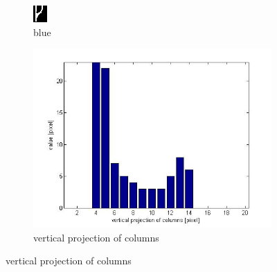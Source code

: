 \begin{figure}
\begin{subfigure}[t]{0.1\textwidth}
        \includegraphics[width=\textwidth]{5b.jpg}
        \caption{blue}
  \end{subfigure}
    \begin{subfigure}[c]{0.4\textwidth}
        \includegraphics[width=\textwidth]{5c.jpg}
        \caption{vertical projection of columns}
  \end{subfigure}
  

\end{figure}
